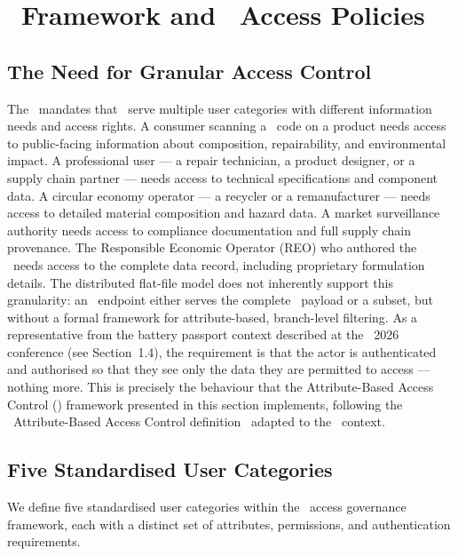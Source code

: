\section{\ABAC\ Framework and \ODRL\ Access Policies}

\subsection{The Need for Granular Access Control}

The \ESPR\ mandates that \DPPs\ serve multiple user categories with different
information needs and access rights. A consumer scanning a \QR\ code on a
product needs access to public-facing information about composition,
repairability, and environmental impact. A professional user --- a repair
technician, a product designer, or a supply chain partner --- needs access to
technical specifications and component data. A circular economy operator --- a
recycler or a remanufacturer --- needs access to detailed material composition
and hazard data. A market surveillance authority needs access to compliance
documentation and full supply chain provenance. The Responsible Economic
Operator (REO) who authored the \DPP\ needs access to the complete data record,
including proprietary formulation details. The distributed flat-file model does
not inherently support this granularity: an \REO\ endpoint either serves the
complete \DPP\ payload or a subset, but without a formal framework for
attribute-based, branch-level filtering. As a representative from the battery
passport context described at the \DPPforEU~2026 conference (see Section~1.4),
the requirement is that the actor is authenticated and authorised so that they
see only the data they are permitted to access --- nothing more. This is
precisely the behaviour that the Attribute-Based Access Control (\ABAC)
framework presented in this section implements, following the \NIST\
Attribute-Based Access Control definition~\cite{abac_nist} adapted to the \DPP\
context.

\subsection{Five Standardised User Categories}

We define five standardised user categories within the \DPP\ access governance
framework, each with a distinct set of attributes, permissions, and
authentication requirements.

